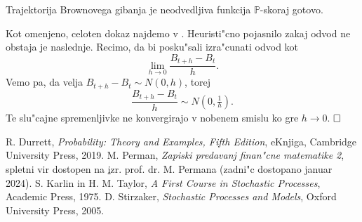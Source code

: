 \documentclass[twoside,11pt]{article}
\begin{document}
\begin{izrek}
    Trajektorija Brownovega gibanja je neodvedljiva funkcija $\mathbb{P}$-skoraj gotovo.
\end{izrek}

\begin{dokaz}
    Kot omenjeno, celoten dokaz najdemo v \cite{1}. Heuristi"cno pojasnilo zakaj odvod ne obstaja je naslednje. Recimo, da bi posku"sali izra"cunati odvod kot
    $$
        \lim_{h\to0}\frac{B_{t+h} - B_t}{h}.
    $$
    Vemo pa, da velja $B_{t+h} - B_t \sim N(0, h)$, torej
    $$
        \frac{B_{t+h} - B_t}{h} \sim N(0, \tfrac{1}{h}).
    $$
    Te slu"cajne spremenljivke ne konvergirajo v nobenem smislu ko gre $h \rightarrow 0$. 
    $\hfill \square$
\end{dokaz}

\begin{thebibliography}{99}

 R. Durrett, \emph{Probability: Theory and Examples, Fifth Edition}, eKnjiga, Cambridge University Press, 2019. 
 M. Perman, \emph{Zapiski predavanj finan"cne matematike 2}, spletni vir dostopen na \href{http://valjhun.fmf.uni-lj.si} izr. prof. dr. M. Permana (zadni"c dostopano januar 2024).
 S. Karlin in H. M. Taylor, \emph{A First Course in Stochastic Processes}, Academic Press, 1975.
 D. Stirzaker, \emph{Stochastic Processes and Models}, Oxford University Press, 2005.


\end{thebibliography}
\end{document}
